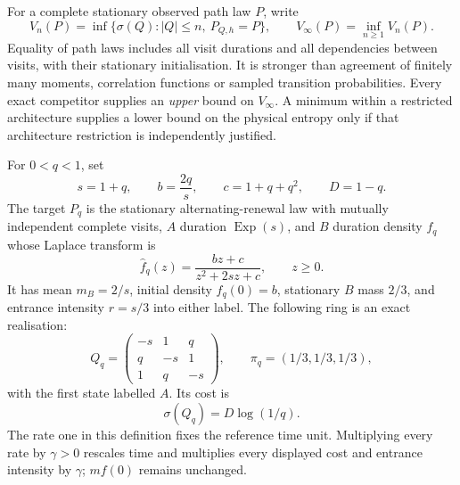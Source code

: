 \documentclass[11pt,a4paper]{article}
\theoremstyle{remark}\newtheorem{remark}[theorem]{Remark}
\newcommand{\Exp}{\operatorname{Exp}}
\begin{document}
For a complete stationary observed path law $P$, write
\begin{equation}\label{eq:vn}
 V_n(P)=\inf\{\sigma(Q):|Q|\leq n,\ P_{Q,h}=P\},\qquad
 V_\infty(P)=\inf_{n\geq1}V_n(P).
\end{equation}
Equality of path laws includes all visit durations and all dependencies
between visits, with their stationary initialisation. It is stronger than
agreement of finitely many moments, correlation functions or sampled
transition probabilities. Every exact competitor supplies an \emph{upper}
bound on $V_\infty$. A minimum within a restricted architecture supplies a
lower bound on the physical entropy only if that architecture restriction is
independently justified.

For $0<q<1$, set
\begin{equation}\label{eq:constants}
 s=1+q,\qquad b=\frac{2q}{s},\qquad c=1+q+q^2,\qquad D=1-q.
\end{equation}
The target $P_q$ is the stationary alternating-renewal law with mutually
independent complete visits, $A$ duration $\Exp(s)$, and $B$ duration density
$f_q$ whose Laplace transform is
\begin{equation}\label{eq:target}
 \widehat f_q(z)=\frac{bz+c}{z^2+2sz+c},\qquad z\geq0.
\end{equation}
It has mean $m_B=2/s$, initial density $f_q(0)=b$, stationary $B$ mass $2/3$,
and entrance intensity $r=s/3$ into either label. The following ring is an
exact realisation:
\begin{equation}\label{eq:ring}
 Q_q=\begin{pmatrix}-s&1&q\\q&-s&1\\1&q&-s\end{pmatrix},\qquad
 \pi_q=(1/3,1/3,1/3),
\end{equation}
with the first state labelled $A$. Its cost is
\begin{equation}\label{eq:ringcost}
 \sigma(Q_q)=D\log(1/q).
\end{equation}
The rate one in this definition fixes the reference time unit. Multiplying
every rate by $\gamma>0$ rescales time and multiplies every displayed cost and
entrance intensity by $\gamma$; $mf(0)$ remains unchanged.
\end{document}
